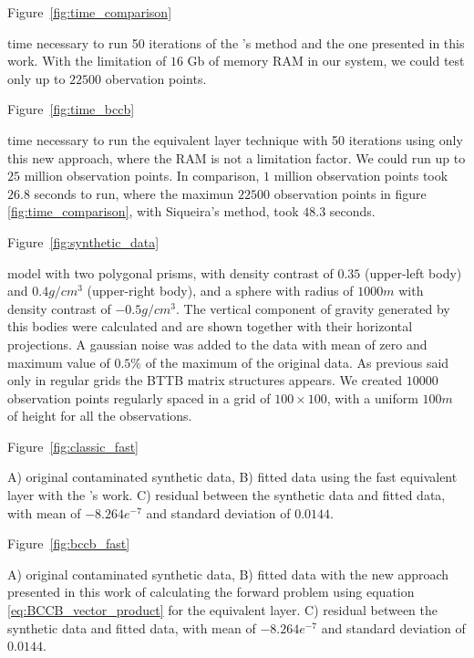 \documentclass[paper]{geophysics}
\begin{document}
Figure~\ref{fig:time_comparison}

{time necessary to run 50 iterations of the \cite{siqueira2017fast}'s method and the one presented in this work. With the limitation of $16$ Gb of memory RAM in our system, we could test only up to $22500$ obervation points.}

Figure~\ref{fig:time_bccb}

{time necessary to run the equivalent layer technique with 50 iterations using only this new approach, where the RAM is not a limitation factor. We could run up to $25$ million observation points. In comparison, $1$ million observation points took $26.8$ seconds to run, where the maximun $22500$ observation points in figure \ref{fig:time_comparison}, with Siqueira's method, took $48.3$ seconds.}
\newpage

Figure~\ref{fig:synthetic_data}

{model with two polygonal prisms, with density contrast of $0.35$ (upper-left body) and $0.4 g/cm^3$ (upper-right body), and a sphere with radius of $1000 m$ with density contrast of $-0.5 g/cm^3$. The vertical component of gravity generated by this bodies were calculated and are shown together with their horizontal projections. A gaussian noise was added to the data with mean of zero and maximum value of $0.5\%$ of the maximum of the original data. As previous said only in regular grids the BTTB matrix structures appears. We created $10000$ observation points regularly spaced in a grid of $100 \times 100$, with a uniform $100 m$ of height for all the observations.}
\newpage

Figure~\ref{fig:classic_fast}

{A) original contaminated synthetic data, B) fitted data using the fast equivalent layer with the \cite{siqueira2017fast}'s work. C) residual between the synthetic data and fitted data, with mean of $-8.264e^{-7}$ and standard deviation of $0.0144$.}
\newpage

Figure~\ref{fig:bccb_fast}

{A) original contaminated synthetic data, B) fitted data with the new approach presented in this work of calculating the forward problem using equation \ref{eq:BCCB_vector_product} for the equivalent layer. C) residual between the synthetic data and fitted data, with mean of $-8.264e^{-7}$ and standard deviation of $0.0144$.}
\newpage
\end{document}
